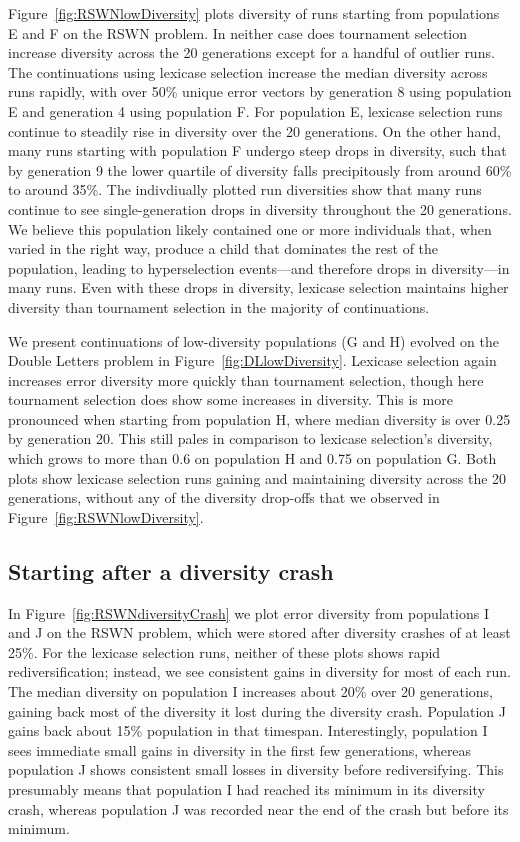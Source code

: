 \documentclass{sig-alternate-05-2015}
\begin{document}
Figure~\ref{fig:RSWNlowDiversity} plots diversity of runs starting from populations E and F on the RSWN problem. In neither case does tournament selection increase diversity across the 20 generations except for a handful of outlier runs. The continuations using lexicase selection increase the median diversity across runs rapidly, with over 50\% unique error vectors by generation 8 using population E and generation 4 using population F. For population E, lexicase selection runs continue to steadily rise in diversity over the 20 generations. On the other hand, many runs starting with population F undergo steep drops in diversity, such that by generation 9 the lower quartile of diversity falls precipitously from around 60\% to around 35\%. The indivdiually plotted run diversities show that many runs continue to see single-generation drops in diversity throughout the 20 generations. We believe this population likely contained one or more individuals that, when varied in the right way, produce a child that dominates the rest of the population, leading to hyperselection events---and therefore drops in diversity---in many runs. Even with these drops in diversity, lexicase selection maintains higher diversity than tournament selection in the majority of continuations.

We present continuations of low-diversity populations (G and H) evolved on the Double Letters problem in Figure~\ref{fig:DLlowDiversity}. Lexicase selection again increases error diversity more quickly than tournament selection, though here tournament selection does show some increases in diversity. This is more pronounced when starting from population H, where median diversity is over 0.25 by generation 20. This still pales in comparison to lexicase selection's diversity, which grows to more than 0.6 on population H and 0.75 on population G. Both plots show lexicase selection runs gaining and maintaining diversity across the 20 generations, without any of the diversity drop-offs that we observed in Figure~\ref{fig:RSWNlowDiversity}.


\subsection{Starting after a diversity crash}
\label{sec:crashDiversityResults}


In Figure~\ref{fig:RSWNdiversityCrash} we plot error diversity from populations I and J on the RSWN problem, which were stored after diversity crashes of at least 25\%.
For the lexicase selection runs, neither of these plots shows rapid rediversification; instead, we see consistent gains in diversity for most of each run.
The median diversity on population I increases about 20\% over 20 generations, gaining back most of the diversity it lost during the diversity crash. Population J gains back about 15\% population in that timespan.
Interestingly, population I sees immediate small gains in diversity in the first few generations, whereas population J shows consistent small losses in diversity before rediversifying. This presumably means that population I had reached its minimum in its diversity crash, whereas population J was recorded near the end of the crash but before its minimum.
\end{document}

